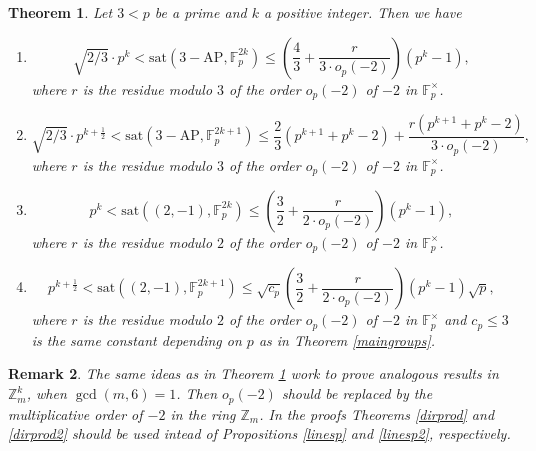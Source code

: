 \documentclass[11pt]{article}
\numberwithin{table}{section}
\newcommand{\F}{{\mathbb F}}
\newcommand{\sat}{\mathrm{sat}}
\newtheorem{theorem}{Theorem}[section]
\newtheorem{remark}[theorem]{Remark}
\theoremstyle{definition}
\begin{document}
	\begin{theorem}\label{mainvectorspace}
		Let $3<p$ be a prime and $k$ a positive integer. Then we have
		\begin{enumerate}[\rm(1)] \vspace{-0.2cm}
			\item \[\sqrt{2/3}\cdot p^{k}<\sat(3-\mathrm{AP}, \F_p^{2k})\leq \left(\frac43+\frac{r}{3\cdot o_{p}(-2)}\right)(p^k-1),\]
			where $r$ is the residue modulo $3$ of the order $o_{p}(-2)$ of $-2$ in $\mathbb{F}_{p}^{\times}$.\vspace{-0.2cm}
			\item
			\[\sqrt{2/3}\cdot p^{k+\frac12}<\sat(3-\mathrm{AP}, \F_p^{2k+1})\leq \frac23(p^{k+1}+p^k-2)+\frac{r(p^{k+1}+p^k-2)}{3\cdot o_{p}(-2)},\]  %
			where $r$ is the residue modulo $3$ of the order $o_{p}(-2)$ of $-2$ in $\mathbb{F}_{p}^{\times}$.
			\vspace{-0.2cm}
			\item 
			\[ p^{k}<\sat((2, -1), \F_p^{2k})\leq \left(\frac32+\frac{r}{2\cdot o_{p}(-2)}\right)(p^k-1),\]  
			where $r$ is the residue modulo $2$ of the order $o_{p}(-2)$ of $-2$ in $\mathbb{F}_{p}^{\times}$.\vspace{-0.2cm}
			
			\vspace{-0.2cm}
			\item \[ p^{k+\frac12}<\sat((2, -1), \F_p^{2k+1})\leq \sqrt{c_p}\left(\frac32+\frac{r}{2\cdot o_{p}(-2)}\right)(p^k-1)\sqrt{p},\]  
			where $r$ is the residue modulo $2$ of the order $o_{p}(-2)$ of $-2$ in $\mathbb{F}_{p}^{\times}$ and $c_p\leq 3$ is  the same constant depending on $p$ as in Theorem \ref{maingroups}.
			
		\end{enumerate}
	\end{theorem}
	
	\begin{remark}
		The same ideas as in Theorem \ref{mainvectorspace} work to prove analogous results in $\mathbb{Z}_m^k$, when $\gcd(m,6)=1$. Then  $o_p(-2)$ should be replaced by the multiplicative order of $-2$ in the ring $\mathbb{Z}_m$. In the proofs Theorems \ref{dirprod} and \ref{dirprod2} should be used intead of Propositions \ref{linesp} and \ref{linesp2}, respectively. 
	\end{remark}
	
\end{document}
